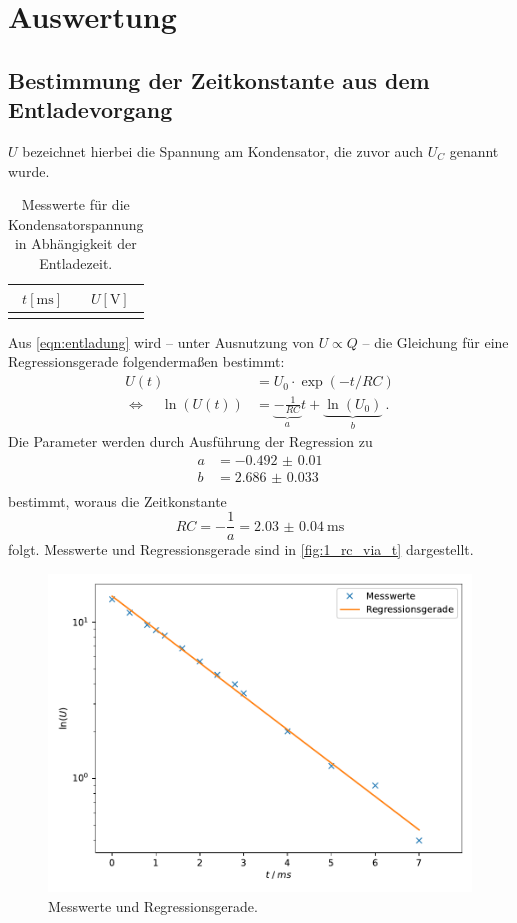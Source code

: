 \section{Auswertung}

\subsection{Bestimmung der Zeitkonstante aus dem Entladevorgang}
\label{auswertung:1}

$U$ bezeichnet hierbei die Spannung am Kondensator, die zuvor auch $U_C$ genannt wurde.

\begin{table}
  \centering
  \caption{Messwerte für die Kondensatorspannung in Abhängigkeit der Entladezeit.}
  \label{tab:mess_1}
  \begin{tabular}{S[table-format=1.1] S[table-format=2.1]}
  \toprule
  $t [\si{\milli\second}]$ &
  $U [\si{\volt}]$ \\
  \midrule
  \bottomrule
  \end{tabular}
\end{table}

Aus \autoref{eqn:entladung} wird
– unter Ausnutzung von $U \propto Q$ –
die Gleichung für eine Regressionsgerade folgendermaßen bestimmt:
\begin{align*}
  U(t) &= U_0 \cdot \exp(-t / RC) \\
  \Leftrightarrow \quad
  \ln(U(t)) &= \underbrace{-\frac{1}{RC}}_a t
  + \underbrace{\ln(U_0)}_b \ .
\end{align*}
Die Parameter werden durch Ausführung der Regression zu
\begin{align*}
  a &= \num{-0.492(10)} \\
  b &= \num{2.686(33)} \\
\end{align*}
bestimmt, woraus die Zeitkonstante
\[ RC = -\frac{1}{a} = \SI{2.03(4)}{\milli\second} \]
folgt.
Messwerte und Regressionsgerade sind in \autoref{fig:1_rc_via_t} dargestellt.

\begin{figure}
    \centering
    \includegraphics[width=\textwidth]{build/plt/1_rc_via_t.pdf}
    \caption{Messwerte und Regressionsgerade.}
    \label{fig:1_rc_via_t}
\end{figure}

